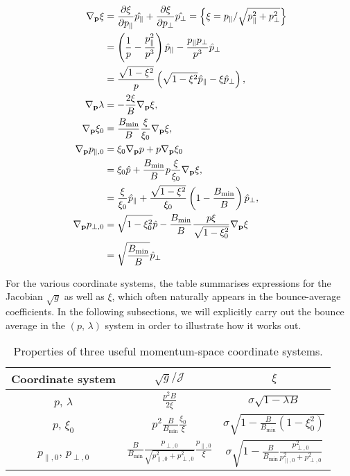 \documentclass[11pt,a4paper]{article}
\newcommand{\sub}[1]{\ensuremath{_{\text{#1}}}}
\renewcommand{\b}[1]{\ensuremath{ {\bf #1 } }}
\begin{document}
\begin{align}
\nabla_\b{p}\xi  &= \frac{\partial \xi}{\partial p_\parallel}\hat{p_\parallel} + \frac{\partial \xi}{\partial p_\perp}\hat{p_\perp} = \left\{\xi = p_\parallel/\sqrt{p_\parallel^2+p_\perp^2}\right\}\nonumber \\
& = \left(\frac{1}{p}-\frac{p_\parallel^2}{p^3}\right)\hat{p}_\parallel - \frac{p_\parallel p_\perp}{p^3} \hat{p}_\perp \nonumber \\
&= \frac{\sqrt{1-\xi^2}}{p}\left(\sqrt{1-\xi^2}\hat{p}_\parallel - \xi \hat{p}_\perp\right), \nonumber \\
\nabla_\b{p} \lambda &= -\frac{2\xi}{B}\nabla_\b{p}\xi, \nonumber \\
 \nabla_\b{p}\xi_0&=\frac{B\sub{min}}{B}\frac{\xi}{\xi_0} \nabla_\b{p}\xi, \nonumber \\
\nabla_\b{p} p_{\parallel,0} &= \xi_0 \nabla_\b{p} p + p \nabla_\b{p}\xi_0 \nonumber \\
&=\xi_0\hat{p} +\frac{B\sub{min}}{B}p\frac{\xi}{\xi_0}\nabla_\b{p}\xi, \nonumber \\
&= \frac{\xi}{\xi_0}\hat{p}_\parallel + \frac{\sqrt{1-\xi^2}}{\xi_0}\left(1-\frac{B\sub{min}}{B}\right)\hat{p}_\perp, \nonumber \\
\nabla_\b{p}p_{\perp,0} &= \sqrt{1-\xi_0^2}\hat{p} - \frac{B\sub{min}}{B}\frac{p \xi}{\sqrt{1-\xi_0^2}}  \nabla_\b{p}\xi \nonumber \\
&= \sqrt{\frac{B\sub{min}}{B}} \hat{p}_\perp
\end{align}

For the various coordinate systems, the table summarises expressions for the Jacobian $\sqrt{g}$ as well as $\xi$, which often naturally appears in the bounce-average coefficients.
In the following subsections, we will explicitly carry out the bounce average in the $(p,\,\lambda)$ system in order to illustrate how it works out. 


\begin{table}
\begin{center}
\caption{Properties of three useful momentum-space coordinate systems.}
\begin{tabular}{|c|c|c|}\hline 
Coordinate system & $\sqrt{g}/\mathcal{J}$ & $\xi$ \\ \hline
$p$, $\lambda$ & $\frac{p^2 B}{2\xi}$ & $\sigma\sqrt{1-\lambda B}$ \\\hline
$p$, $\xi_0$ & $ p^2 \frac{B}{B\sub{min}}\frac{\xi_0}{\xi}$ & $\sigma\sqrt{1-\frac{B}{B\sub{min}}(1-\xi_0^2)}$ \\\hline
$p_{\parallel,0}$, $p_{\perp,0}$ & $\frac{B}{B\sub{min}} \frac{p_{\perp,0}}{\sqrt{p_{\parallel,0}^2+p_{\perp,0}^2}}\frac{p_{\parallel,0}}{\xi}$ & $\sigma\sqrt{1-\frac{B}{B\sub{min}}\frac{p_{\perp,0}^2}{p_{\parallel,0}^2+p_{\perp,0}^2}}$\\
\hline
\end{tabular}
\end{center}
\end{table}
\end{document}
